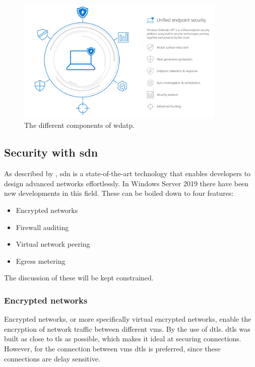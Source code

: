 \begin{figure}[hbt!]
	\centering
	\includegraphics[width=\textwidth,height=6cm,keepaspectratio=true]{img/StandVanZaken/WDATP.png}
	\caption[Components of \acrshort{wdatp}]{The different components of \acrfull{wdatp}. \autocite{Aslaner2018}}
	\label{fig:WDATPT2018}
\end{figure}

\subsection{Security with \acrshort{sdn}}
\label{encrypted-networks}
\label{sdn}
As described by \textcite{Shin2016}, \acrshort{sdn} is a state-of-the-art technology that enables developers to design advanced networks effortlessly. 
In Windows Server 2019 there have been new developments in this field. These can be boiled down to four features: 

\begin{itemize}
	\item Encrypted networks
	\item Firewall auditing
	\item Virtual network peering
	\item Egress metering
\end{itemize} 

The discussion of these will be kept constrained.

\subsubsection{Encrypted networks}
Encrypted networks, or more specifically virtual encrypted networks, enable the encryption of network traffic between different \acrshort{vm}s. 
By the use of \acrfull{dtls}. 
\acrshort{dtls} was built as close to \acrfull{tls} as possible, which makes it ideal at securing connections. 
However, for the connection between \acrshort{vm}s \acrshort{dtls} is preferred, since these connections are delay sensitive. \autocite{Modadugu2004}

